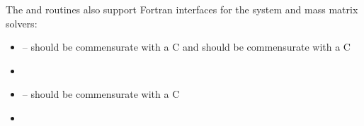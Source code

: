 The  and  routines also support
Fortran interfaces for the system and mass matrix solvers:
\begin{itemize}
\item {} -- 
  should be commensurate with a C  and 
  should be commensurate with a C 
\item {}
\item {} -- 
  should be commensurate with a C 
\item {}
\end{itemize}
